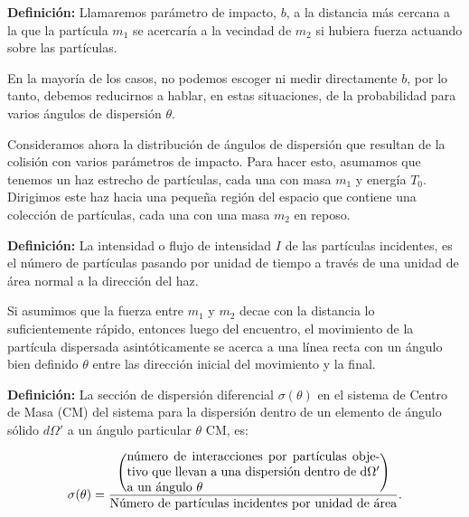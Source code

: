\documentclass[a4paper,10pt]{article}
\numberwithin{equation}{section}
\newcommand{\definicion}{\textbf{Definición: }}
\begin{document}
\vspace{.3cm}

\definicion Llamaremos parámetro de impacto, $b$, a la distancia 
más cercana a la que la partícula $m_1$ se acercaría a la vecindad de $m_2$
si hubiera fuerza actuando sobre las partículas.

\vspace{.3cm}

En la mayoría de los casos, no podemos escoger ni medir directamente $b$,
por lo tanto, debemos reducirnos a hablar, en estas situaciones, de la probabilidad
para varios ángulos de dispersión $\theta$.

\vspace{.3cm}

Consideramos ahora la distribución de ángulos de dispersión que resultan 
de la colisión con varios parámetros de impacto. Para hacer esto, asumamos
que tenemos un haz estrecho de partículas, cada una con masa $m_1$ y energía 
$T_0$. Dirigimos este haz hacia una pequeña región del espacio que contiene 
una colección de partículas, cada una con una masa $m_2$ en reposo. 

\vspace{.3cm}

\definicion La intensidad o flujo de intensidad $I$ de las partículas
incidentes, es el número de partículas pasando por unidad de tiempo a través 
de una unidad de área normal a la dirección del haz. 

\vspace{.3cm}

Si asumimos que la fuerza entre $m_1$ y $m_2$ decae con la distancia 
lo suficientemente rápido, entonces luego del encuentro, el movimiento 
de la partícula dispersada asintóticamente se acerca a una línea 
recta con un ángulo bien definido $\theta$ entre las dirección inicial
del movimiento y la final.

\vspace{.3cm}

\definicion La sección de dispersión diferencial $\sigma (\theta)$ en el 
sistema de Centro de Masa (CM) del sistema para la dispersión dentro de 
un elemento de ángulo sólido $d\Omega'$ a un ángulo particular $\theta$ CM,
es:

\begin{equation}
 \sigma(\theta) = \frac{\left(\text{\parbox{20em}{número de interacciones por partículas objetivo que
 llevan a una dispersión dentro de d$\Omega'$ a un ángulo $\theta$}} \right)}{\text{Número de 
 partículas incidentes por unidad de área}}.
 \label{eq:disper1}
\end{equation}
\end{document}
